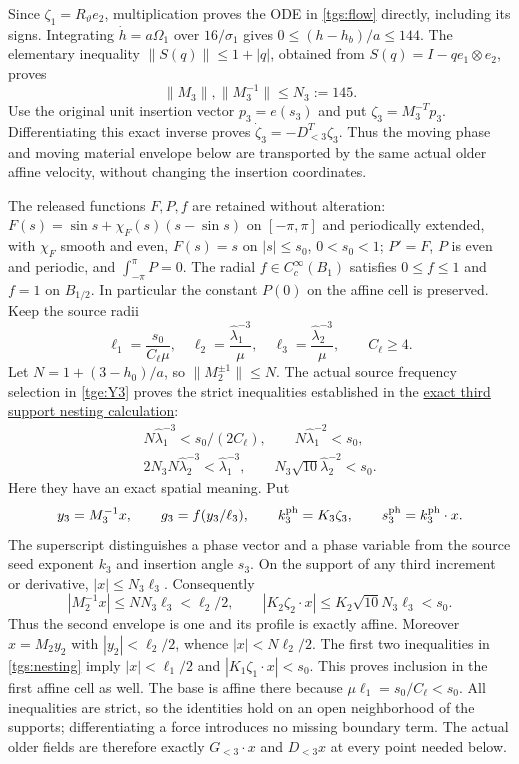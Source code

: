Since $\zeta_1=R_\vartheta e_2$, multiplication proves the ODE
in \eqref{tgs:flow} directly, including its signs.
Integrating $\dot h=a\Omega_1$ over $16/\sigma_1$ gives
$0\leq(h-h_b)/a\leq144$. The elementary inequality
$\|S(q)\|\leq1+|q|$, obtained from
$S(q)=I-qe_1\otimes e_2$, proves
\begin{equation}\label{tgs:matrixbounds}
 \|M_3\|,\|M_3^{-1}\|\leq N_3:=145.
\end{equation}
Use the original unit insertion vector $p_3=e(s_3)$ and put
$\zeta_3=M_3^{-T}p_3$. Differentiating this exact inverse proves
$\dot\zeta_3=-D_{<3}^T\zeta_3$. Thus the moving phase and
moving material envelope below are transported by the same actual
older affine velocity, without changing the insertion coordinates.

The released functions $F,P,f$ are retained without alteration:
$F(s)=\sin s+\chi_F(s)(s-\sin s)$ on $[-\pi,\pi]$ and
periodically extended, with $\chi_F$ smooth and even,
$F(s)=s$ on $|s|\leq s_0$, $0<s_0<1$;
$P'=F$, $P$ is even and periodic, and
$\int_{-\pi}^{\pi}P=0$.
The radial $f\in C_c^\infty(B_1)$ satisfies $0\leq f\leq1$
and $f=1$ on $B_{1/2}$. In particular the constant $P(0)$
on the affine cell is preserved. Keep the source radii
\begin{equation}\label{tgs:radii}
 \ell_1=\frac{s_0}{C_\ell\mu},\quad
 \ell_2=\frac{\widehat\lambda_1^{-3}}\mu,\quad
 \ell_3=\frac{\widehat\lambda_2^{-3}}\mu,\qquad C_\ell\geq4.
\end{equation}
Let $N=1+(3-h_0)/a$, so $\|M_2^{\pm1}\|\leq N$.
The actual source frequency selection in \eqref{tge:Y3} proves
the strict inequalities established in the
\hyperref[tge:nesting]{exact third support nesting calculation}:
\begin{equation}\label{tgs:nesting}
 \begin{gathered}
 N\widehat\lambda_1^{-3}<s_0/(2C_\ell),\qquad
 N\widehat\lambda_1^{-2}<s_0,\\
 2N_3N\widehat\lambda_2^{-3}<\widehat\lambda_1^{-3},
 \qquad N_3\sqrt{10}\widehat\lambda_2^{-2}<s_0.
 \end{gathered}
\end{equation}
Here they have an exact spatial meaning. Put
\[
 y_3=M_3^{-1}x,\qquad g_3=f(y_3/\ell_3),\qquad
 k_3^{\rm ph}=K_3\zeta_3,\qquad s_3^{\rm ph}=k_3^{\rm ph}\cdot x.
\]
The superscript distinguishes a phase vector and a phase variable
from the source seed exponent $k_3$ and insertion angle $s_3$.
On the support of any third increment or derivative,
$|x|\leq N_3\ell_3$. Consequently
\[
 |M_2^{-1}x|\leq NN_3\ell_3<\ell_2/2,\qquad
 |K_2\zeta_2\cdot x|\leq K_2\sqrt{10}N_3\ell_3<s_0.
\]
Thus the second envelope is one and its profile is exactly affine.
Moreover $x=M_2y_2$ with $|y_2|<\ell_2/2$, whence
$|x|<N\ell_2/2$. The first two inequalities in
\eqref{tgs:nesting} imply $|x|<\ell_1/2$ and
$|K_1\zeta_1\cdot x|<s_0$.
This proves inclusion in the first affine cell as well.
The base is affine there because $\mu\ell_1=s_0/C_\ell<s_0$.
All inequalities are strict, so the identities hold on an open
neighborhood of the supports; differentiating a force introduces
no missing boundary term. The actual older fields are therefore
exactly $G_{<3}\cdot x$ and $D_{<3}x$ at every point needed below.

